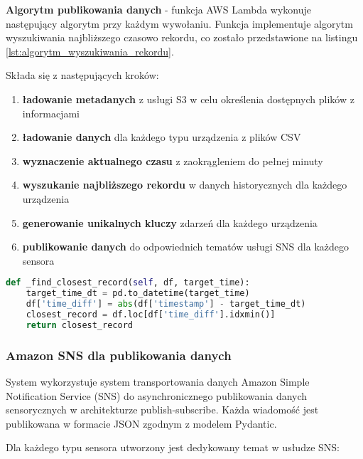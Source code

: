 \textbf{Algorytm publikowania danych} - funkcja AWS Lambda wykonuje następujący algorytm przy każdym wywołaniu. Funkcja implementuje algorytm wyszukiwania najbliższego czasowo rekordu, co zostało przedstawione na listingu \ref{lst:algorytm_wyszukiwania_rekordu}. 

\vspace{0.3em}

Składa się z następujących kroków:

\begin{enumerate}
    \item \textbf{ładowanie metadanych} z usługi S3 w celu określenia dostępnych plików z informacjami
    \item \textbf{ładowanie danych} dla każdego typu urządzenia z plików CSV
    \item \textbf{wyznaczenie aktualnego czasu} z zaokrągleniem do pełnej minuty
    \item \textbf{wyszukanie najbliższego rekordu} w danych historycznych dla każdego urządzenia
    \item \textbf{generowanie unikalnych kluczy} zdarzeń dla każdego urządzenia
    \item \textbf{publikowanie danych} do odpowiednich tematów usługi SNS dla każdego sensora
\end{enumerate}

\begin{lstlisting}[language=Python, caption=Algorytm wyszukiwania najbliższego rekordu, label={lst:algorytm_wyszukiwania_rekordu}]
def _find_closest_record(self, df, target_time):
    target_time_dt = pd.to_datetime(target_time)
    df['time_diff'] = abs(df['timestamp'] - target_time_dt)
    closest_record = df.loc[df['time_diff'].idxmin()]
    return closest_record
\end{lstlisting}

\subsubsection{Amazon SNS dla publikowania danych}
\label{subsec:amazon_sns}

System wykorzystuje system transportowania danych Amazon Simple Notification Service (SNS) do asynchronicznego publikowania danych sensorycznych w architekturze publish-subscribe. Każda wiadomość jest publikowana w formacie JSON zgodnym z modelem Pydantic.

\vspace{0.3em}

Dla każdego typu sensora utworzony jest dedykowany temat w usłudze SNS:

